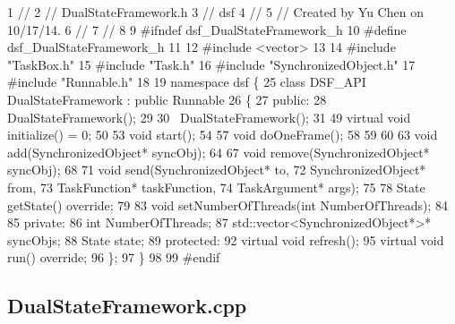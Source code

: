 \begin{DoxyCodeInclude}
1 \textcolor{comment}{//}
2 \textcolor{comment}{//  DualStateFramework.h}
3 \textcolor{comment}{//  dsf}
4 \textcolor{comment}{//}
5 \textcolor{comment}{//  Created by Yu Chen on 10/17/14.}
6 \textcolor{comment}{//}
7 \textcolor{comment}{//}
8 
9 \textcolor{preprocessor}{#ifndef dsf\_DualStateFramework\_h}
10 \textcolor{preprocessor}{#define dsf\_DualStateFramework\_h}
11 
12 \textcolor{preprocessor}{#include <vector>}
13 
14 \textcolor{preprocessor}{#include "TaskBox.h"}
15 \textcolor{preprocessor}{#include "Task.h"}
16 \textcolor{preprocessor}{#include "SynchronizedObject.h"}
17 \textcolor{preprocessor}{#include "Runnable.h"}
18 
19 \textcolor{keyword}{namespace }dsf \{
25     \textcolor{keyword}{class }DSF\_API DualStateFramework : \textcolor{keyword}{public} Runnable
26     \{
27     \textcolor{keyword}{public}:
28         DualStateFramework();
29         
30         ~DualStateFramework();
31         
49         \textcolor{keyword}{virtual} \textcolor{keywordtype}{void} initialize() = 0;
50         
53         \textcolor{keywordtype}{void} start();
54         
57         \textcolor{keywordtype}{void} doOneFrame();
58         
59         
60         
63         \textcolor{keywordtype}{void} add(SynchronizedObject* syncObj);
64         
67         \textcolor{keywordtype}{void} \textcolor{keyword}{remove}(SynchronizedObject* syncObj);
68         
71         \textcolor{keywordtype}{void} send(SynchronizedObject* to,
72                   SynchronizedObject* from,
73                   TaskFunction* taskFunction,
74                   TaskArgument* args);
75         
78         State getState() \textcolor{keyword}{override};
79         
83         \textcolor{keywordtype}{void} setNumberOfThreads(\textcolor{keywordtype}{int} NumberOfThreads);
84         
85     \textcolor{keyword}{private}:
86         \textcolor{keywordtype}{int} NumberOfThreads;
87         std::vector<SynchronizedObject*>* syncObjs;
88         State state;
89     \textcolor{keyword}{protected}:
92         \textcolor{keyword}{virtual} \textcolor{keywordtype}{void} refresh();
95          \textcolor{keyword}{virtual} \textcolor{keywordtype}{void} run() \textcolor{keyword}{override};
96     \};
97 \}
98 
99 \textcolor{preprocessor}{#endif}
\end{DoxyCodeInclude}
 \hypertarget{_dual_state_framework_DualStateFrameworkDualStateFramework_cpp}{}\subsection{Dual\+State\+Framework.\+cpp}\label{_dual_state_framework_DualStateFrameworkDualStateFramework_cpp}
